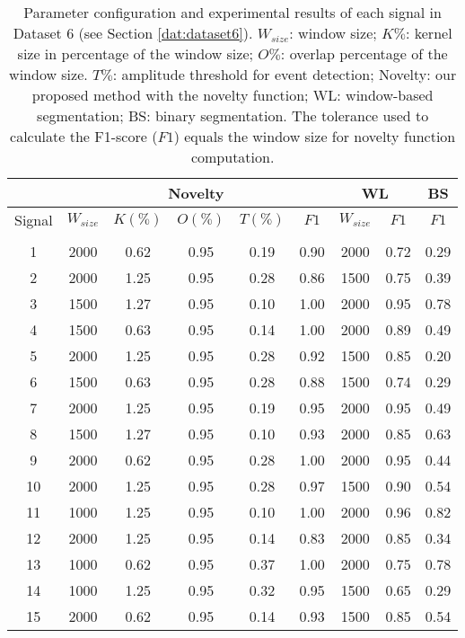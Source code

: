 \begin{table}[H]
    \caption{Parameter configuration and experimental results of each signal in Dataset 6 (see Section \ref{dat:dataset6}). $W_{size}$: window size; $K\%$: kernel size in percentage of the window size; $O\%$: overlap percentage of the window size. $T\%$: amplitude threshold for event detection; Novelty: our proposed method with the novelty function; WL: window-based segmentation; BS: binary segmentation. The tolerance used to calculate the F1-score ($F1$) equals the window size for novelty function computation.}
    \label{tab:params_results_4}
    \centering
    \begin{tabular}{ccccccccc}
    \toprule
     & \multicolumn{5}{c}{Novelty} & \multicolumn{2}{c}{WL} & BS\\
    \midrule
    Signal &     $W_{size}$ &     $K(\%)$ &     $O(\%)$ &  $T(\%)$    &     $F1$ & $W_{size}$ & $F1$ & $F1$\\
    \cmidrule(lr){2-6} \cmidrule(lr){7-8} \cmidrule(lr){9-9}\\
    1 & 2000 & 0.62 & 0.95 & 0.19 & 0.90 & 2000 & 0.72 & 0.29 \\ 
    2 & 2000 & 1.25 & 0.95 & 0.28 & 0.86 & 1500 & 0.75 & 0.39 \\ 
    3 & 1500 & 1.27 & 0.95 & 0.10 & 1.00 & 2000 & 0.95 & 0.78 \\ 
    4 & 1500 & 0.63 & 0.95 & 0.14 & 1.00 & 2000 & 0.89 & 0.49 \\ 
    5 & 2000 & 1.25 & 0.95 & 0.28 & 0.92 & 1500 & 0.85 & 0.20 \\ 
    6 & 1500 & 0.63 & 0.95 & 0.28 & 0.88 & 1500 & 0.74 & 0.29 \\ 
    7 & 2000 & 1.25 & 0.95 & 0.19 & 0.95 & 2000 & 0.95 & 0.49 \\ 
    8 & 1500 & 1.27 & 0.95 & 0.10 & 0.93 & 2000 & 0.85 & 0.63 \\ 
    9 & 2000 & 0.62 & 0.95 & 0.28 & 1.00 & 2000 & 0.95 & 0.44 \\ 
    10 & 2000 & 1.25 & 0.95 & 0.28 & 0.97 & 1500 & 0.90 & 0.54 \\ 
    11 & 1000 & 1.25 & 0.95 & 0.10 & 1.00 & 2000 & 0.96 & 0.82 \\ 
    12 & 2000 & 1.25 & 0.95 & 0.14 & 0.83 & 2000 & 0.85 & 0.34 \\ 
    13 & 1000 & 0.62 & 0.95 & 0.37 & 1.00 & 2000 & 0.75 & 0.78 \\ 
    14 & 1000 & 1.25 & 0.95 & 0.32 & 0.95 & 1500 & 0.65 & 0.29 \\ 
    15 & 2000 & 0.62 & 0.95 & 0.14 & 0.93 & 1500 & 0.85 & 0.54 \\ 

\end{tabular}
\end{table}
